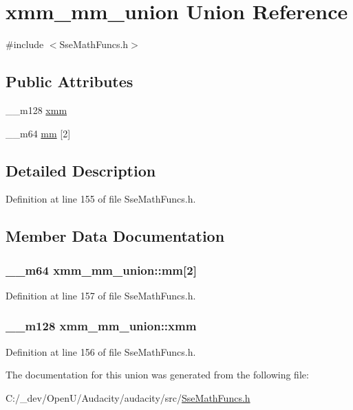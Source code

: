 \hypertarget{unionxmm__mm__union}{}\section{xmm\+\_\+mm\+\_\+union Union Reference}
\label{unionxmm__mm__union}


{\ttfamily \#include $<$Sse\+Math\+Funcs.\+h$>$}

\subsection*{Public Attributes}
\begin{DoxyCompactItemize}
\item 
\+\_\+\+\_\+m128 \hyperlink{unionxmm__mm__union_a813c630f87af9e1a86b4e1dd9df90794}{xmm}
\item 
\+\_\+\+\_\+m64 \hyperlink{unionxmm__mm__union_a99967e9b265807ef42865752687a891a}{mm} \mbox{[}2\mbox{]}
\end{DoxyCompactItemize}


\subsection{Detailed Description}


Definition at line 155 of file Sse\+Math\+Funcs.\+h.



\subsection{Member Data Documentation}
\subsubsection[{\texorpdfstring{mm}{mm}}]{\setlength{\rightskip}{0pt plus 5cm}\+\_\+\+\_\+m64 xmm\+\_\+mm\+\_\+union\+::mm\mbox{[}2\mbox{]}}\hypertarget{unionxmm__mm__union_a99967e9b265807ef42865752687a891a}{}\label{unionxmm__mm__union_a99967e9b265807ef42865752687a891a}


Definition at line 157 of file Sse\+Math\+Funcs.\+h.

\subsubsection[{\texorpdfstring{xmm}{xmm}}]{\setlength{\rightskip}{0pt plus 5cm}\+\_\+\+\_\+m128 xmm\+\_\+mm\+\_\+union\+::xmm}\hypertarget{unionxmm__mm__union_a813c630f87af9e1a86b4e1dd9df90794}{}\label{unionxmm__mm__union_a813c630f87af9e1a86b4e1dd9df90794}


Definition at line 156 of file Sse\+Math\+Funcs.\+h.



The documentation for this union was generated from the following file\+:\begin{DoxyCompactItemize}
\item 
C\+:/\+\_\+dev/\+Open\+U/\+Audacity/audacity/src/\hyperlink{_sse_math_funcs_8h}{Sse\+Math\+Funcs.\+h}\end{DoxyCompactItemize}
